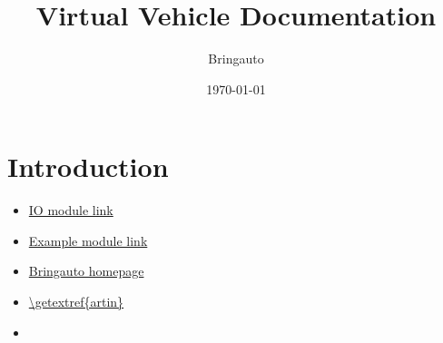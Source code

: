 \documentclass{article}
\title{Virtual Vehicle Documentation}
\author{Bringauto}
\date{\today}
\begin{document}
\maketitle %

\tableofcontents

\section{Introduction}

\begin{itemize}
    \item \href{\getref{io_module}}{IO module link}
    \item \href{\getref{example_module}}{Example module link}
    \item \href{\getextref{bringauto}}{Bringauto homepage}
    \item \url{\getextref{artin}}
    \item {}
\end{itemize}
\end{document}
